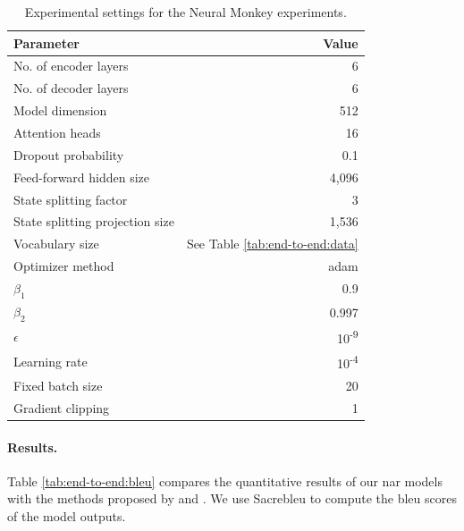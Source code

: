 \begin{table}
  \centering
  \begin{tabular}{lr}
    \toprule
    Parameter & Value \\
    \midrule
    No. of encoder layers & 6 \\
    No. of decoder layers & 6 \\
    Model dimension & 512 \\
    Attention heads & 16 \\
    Dropout probability & 0.1 \\
    Feed-forward hidden size & 4,096 \\
    State splitting factor & 3 \\
    State splitting projection size & 1,536 \\
    Vocabulary size & See Table \ref{tab:end-to-end:data} \\
    \midrule
    Optimizer method & adam \\
    $\beta_1$ & 0.9 \\
    $\beta_2$ & 0.997 \\
    $\epsilon$ & 10\textsuperscript{-9} \\
    Learning rate & 10\textsuperscript{-4} \\
    Fixed batch size & 20 \\
    Gradient clipping & 1 \\
    \bottomrule
  \end{tabular}

  \caption{Experimental settings for the Neural Monkey experiments.}%
  \label{tab:end-to-end:hparams}
\end{table}


\paragraph{Results.} Table \ref{tab:end-to-end:bleu} compares the quantitative
results of our \ac{nar} models with the methods proposed by
\citet{gu2017nonautoregressive} and \citet{lee-etal-2018-deterministic}. We use
Sacrebleu \citep{post-2018-call} to compute the \acs{bleu} scores of the model
outputs.

